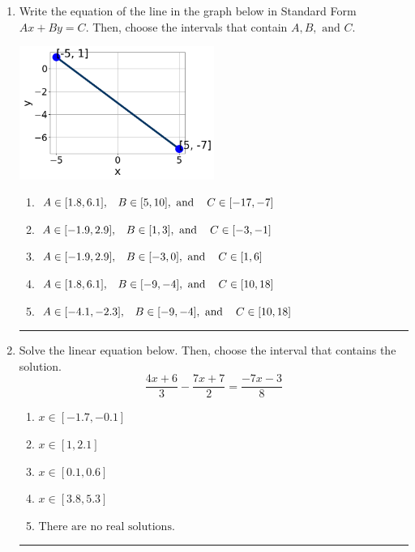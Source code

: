 \documentclass[14pt]{extbook}
\newcommand{\litem}[1]{\item#1\hspace*{-1cm}\rule{\textwidth}{0.4pt}}
\begin{document}
\begin{enumerate}
{\begin{enumerate}[label=\Alph*.]
\end{enumerate} }
\litem{
Write the equation of the line in the graph below in Standard Form $Ax+By=C$. Then, choose the intervals that contain $A, B, \text{ and } C$.
\begin{center}
    \includegraphics[width=0.5\textwidth]{../Figures/linearGraphToStandardCopyA.png}
\end{center}
\begin{enumerate}[label=\Alph*.]
\item \( A \in [1.8, 6.1], \hspace{3mm} B \in [5, 10], \text{ and } \hspace{3mm} C \in [-17, -7] \)
\item \( A \in [-1.9, 2.9], \hspace{3mm} B \in [1, 3], \text{ and } \hspace{3mm} C \in [-3, -1] \)
\item \( A \in [-1.9, 2.9], \hspace{3mm} B \in [-3, 0], \text{ and } \hspace{3mm} C \in [1, 6] \)
\item \( A \in [1.8, 6.1], \hspace{3mm} B \in [-9, -4], \text{ and } \hspace{3mm} C \in [10, 18] \)
\item \( A \in [-4.1, -2.3], \hspace{3mm} B \in [-9, -4], \text{ and } \hspace{3mm} C \in [10, 18] \)

\end{enumerate} }
\litem{
Solve the linear equation below. Then, choose the interval that contains the solution.\[ \frac{4x + 6}{3} - \frac{7x + 7}{2} = \frac{-7x -3}{8} \]\begin{enumerate}[label=\Alph*.]
\item \( x \in [-1.7, -0.1] \)
\item \( x \in [1, 2.1] \)
\item \( x \in [0.1, 0.6] \)
\item \( x \in [3.8, 5.3] \)
\item \( \text{There are no real solutions.} \)


\end{enumerate}}
\end{enumerate}
\end{document}
